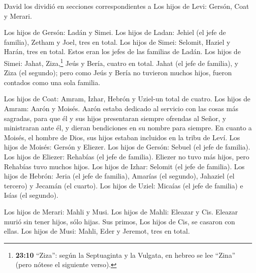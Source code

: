  David los dividió en secciones correspondientes a Los hijos
de Levi: Gersón, Coat y Merari.

 Los hijos de Gersón: Ladán y Simei.  Los hijos
de Ladan: Jehiel (el jefe de familia), Zetham y Joel, tres en total.
 Los hijos de Simei: Selomit, Haziel y Harán, tres en total.
Estos eran los jefes de las familias de Ladán.  Los hijos
de Simei: Jahat, Ziza,\footnote{\textbf{23:10} ``Ziza'': según la
  Septuaginta y la Vulgata, en hebreo se lee ``Zina'' (pero nótese el
  siguiente verso).} Jeús y Bería, cuatro en total.  Jahat
(el jefe de familia), y Ziza (el segundo); pero como Jeús y Bería no
tuvieron muchos hijos, fueron contados como una sola familia.

 Los hijos de Coat: Amram, Izhar, Hebrón y Uziel-un total
de cuatro.  Los hijos de Amram: Aarón y Moisés. Aarón
estaba dedicado al servicio con las cosas más sagradas, para que él y
sus hijos presentaran siempre ofrendas al Señor, y ministraran ante él,
y dieran bendiciones en su nombre para siempre.  En cuanto
a Moisés, el hombre de Dios, sus hijos estaban incluidos en la tribu de
Leví.  Los hijos de Moisés: Gersón y Eliezer. 
Los hijos de Gersón: Sebuel (el jefe de familia).  Los
hijos de Eliezer: Rehabías (el jefe de familia). Eliezer no tuvo más
hijos, pero Rehabías tuvo muchos hijos.  Los hijos de
Izhar: Selomit (el jefe de familia).  Los hijos de Hebrón:
Jeria (el jefe de familia), Amarías (el segundo), Jahaziel (el tercero)
y Jecamán (el cuarto).  Los hijos de Uziel: Micaías (el
jefe de familia) e Isías (el segundo).

 Los hijos de Merari: Mahli y Musi. Los hijos de Mahli:
Eleazar y Cis.  Eleazar murió sin tener hijos, sólo hijas.
Sus primos, Los hijos de Cis, se casaron con ellas.  Los
hijos de Musi: Mahli, Eder y Jeremot, tres en total.

